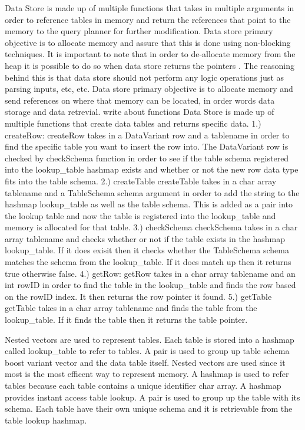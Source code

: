 \documentclass[letterpaper, 12pt]{article}
\begin{document}
	Data Store is made up of multiple functions that takes in multiple arguments in order to reference tables in memory and return the references that point to the memory to the query planner for further modification. Data store primary objective is to allocate memory and assure that this is done using non-blocking techniques. It is important to note that in order to de-allocate memory from the heap it is possible to do so when data store returns the pointers . The reasoning behind this is that data store should not perform any logic operations just as parsing inputs, etc, etc. Data store primary objective is to allocate memory and send references on where that memory can be located, in order words data storage and data retrevial. 
write about functions
	Data Store is made up of multiple functions that create data tables and returns specific data.
1.) createRow:
		createRow takes in a DataVariant row and a tablename in order to find the specific table
		you want to insert the row into. The DataVariant row is checked by checkSchema function in
		order to see if the table schema registered into the lookup\_table hashmap exists and whether
		or not the new row data type fits into the table schema.
2.) createTable
		createTable takes in a char array tablename and a TableSchema schema argument in order to add
		the string to the hashmap lookup_table as well as the table schema. This is added as a pair
		into the lookup table and now the table is registered into the lookup\_table and memory is allocated
		for that table.
3.) checkSchema
		checkSchema takes in a char array tablename and checks whether or not if the table exists in the
		hashmap lookup_table. If it does exisit then it checks whether the TableSchema schema matches the
		schema from the lookup\_table. If it does match up then it returns true otherwise false.
4.) getRow:
		getRow takes in a char array tablename and an int rowID in order to find the table in the lookup_table
		and finds the row based on the rowID index. It then returns the row pointer it found.
5.) getTable
		getTable takes in a char array tablename and finds the table from the lookup\_table. If it finds the table
		then it returns the table pointer.

	Nested vectors are used to represent tables. Each table is stored into a hashmap called lookup_table to refer to
	tables. A pair is used to group up table schema boost variant vector and the data table itself. Nested vectors
	are used since it most is the most efficent way to represent memory. A hashmap is used to refer tables because each
	table contains a unique identifier char array. A hashmap provides instant access table lookup. A pair is used to group
	up the table with its schema. Each table have their own unique schema and it is retrievable from the table lookup hashmap.
\end{document}
